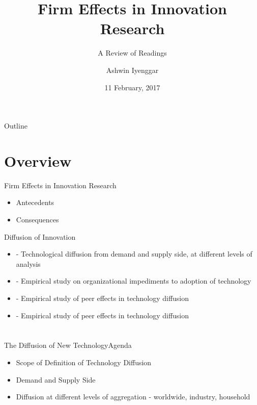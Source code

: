 \documentclass{beamer}
\title{Firm Effects in Innovation Research}
\subtitle{A Review of Readings}
\author{Ashwin Iyenggar}
\institute[Indian Institute of Management Bangalore] 
{
  Corporate Strategy and Policy\\
  Indian Institute of Management Bangalore
}
\date{11 February, 2017}
\begin{document}
\begin{frame}
  \titlepage
\end{frame}

\begin{frame}{Outline}
  \tableofcontents
\end{frame}

\section{Overview}
\begin{frame}{Firm Effects in Innovation Research}{}
\begin{itemize}
\item{Antecedents}
\item{Consequences}
\end{itemize}
\end{frame}

\begin{frame}{Diffusion of Innovation}{}
\begin{itemize}
\item{\cite{Cohen2010} - Technological diffusion from demand and supply side, at different levels of analysis}
\item{\cite{Teece1986} - Empirical study on organizational impediments to adoption of technology}
\item{\cite{Agrawal2014} - Empirical study of peer effects in technology diffusion}
\item{\cite{igami2015} - Empirical study of peer effects in technology diffusion}
\end{itemize}
\end{frame}



\section{\cite{Cohen2010}}
\begin{frame}{The Diffusion of New Technology}{Agenda}
\begin{itemize}
\item{Scope of Definition of Technology Diffusion}
\item{Demand and Supply Side}
\item{Diffusion at different levels of aggregation - worldwide, industry, household}
\end{itemize}
\end{frame}
\end{document}
